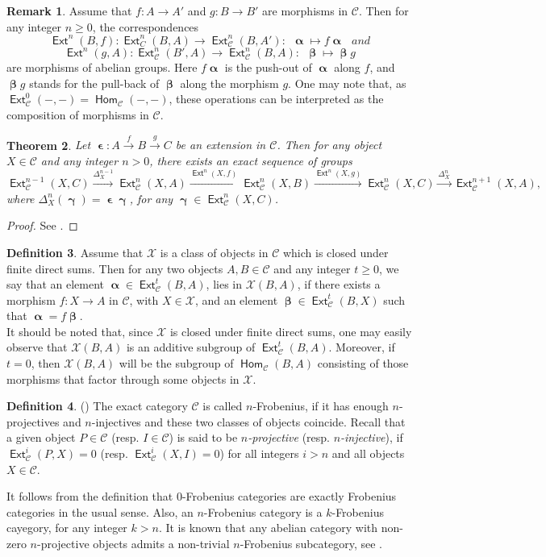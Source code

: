 \documentclass[11pt,a4paper]{amsart}
\newcommand{\rt}{\rightarrow}
\newcommand{\lrt}{\longrightarrow}
\newcommand{\st}{\stackrel}
\newcommand{\C}{\mathscr{C} }
\def\Ext{\operatorname{{\mathsf{Ext}}}}
\def\hom{\operatorname{{\mathsf{Hom}}}}
\def\hom{\operatorname{\mathsf{Hom}}}
\def\X{\mathcal{X}}
\def\al{\operatorname{\boldsymbol{\alpha}}}
\def\be{\operatorname{\boldsymbol{\beta}}}
\def\ga{\operatorname{\boldsymbol{\gamma}}}
\def\ep{\operatorname{\boldsymbol{\epsilon}}}
\newtheorem{theorem}{Theorem}[section]
\theoremstyle{definition}
\newtheorem{dfn}[theorem]{Definition}
\newtheorem{rem}[theorem]{Remark}
\theoremstyle{plain}
\theoremstyle{definition}
\numberwithin{equation}{section}
\begin{document}
\begin{rem}Assume that $f:A\rt A'$ and $g:B\rt B'$ are morphisms in $\C$. Then for any integer $n\geq 0$, the correspondences  $$\Ext^n(B, f):\Ext^n_C(B, A)\lrt\Ext^n_{\C}(B, A') :~~\al\mapsto f\al ~~~and$$
$$\Ext^n(g, A):\Ext^n_{\C}(B', A)\lrt\Ext^n_{\C}(B, A) :~~\be\mapsto \be g$$
are morphisms of abelian groups. Here $f\al$ is the push-out of $\al$ along $f$, and $\be g$ stands for the pull-back of $\be$ along the morphism $g$. One may note that, as $\Ext^0_{\C}(-, -)=\hom_{\C}(-, -)$, these operations can be interpreted as the composition of morphisms in $\C$.
\end{rem}

\begin{theorem}\label{long}Let $\ep: A\st{f}\rt B\st{g}\rt C$ be an extension in $\C$. Then for any object $X\in\C$ and any integer $n>0$, there exists an exact sequence of groups
$$\Ext^{n-1}_{\C}(X, C)\st{\Delta^{n-1}_X}\lrt\Ext^n_{\C}(X, A)\st{\Ext^n(X, f)}\lrt\Ext^n_{\C}(X, B)\st{\Ext^n(X, g)}\lrt\Ext^n_{\C}(X, C)\st{\Delta^n_X}\lrt\Ext^{n+1}_{\C}(X, A),$$where $\Delta^n_{X}(\ga)=\ep\ga$, for any $\ga\in\Ext^n_{\C}(X, C)$.
\end{theorem}
\begin{proof}See \cite[Chapter VII, Theorem 5.1]{mit}.
\end{proof}

\begin{dfn}\label{x}Assume that $\X$ is a class of objects in $\C$ which is closed under finite direct sums. Then for any two objects $A, B\in\C$ and any integer $t\geq 0$, we say that an element $\al\in\Ext^t_{\C}(B, A)$, lies in $\X(B, A)$, if there exists a morphism $f:X\rt A$ in $\C$, with $X\in\X$, and an element $\be\in\Ext^t_{\C}(B, X)$ such that $\al=f\be$. \\
It should be noted that, since $\X$ is closed under finite direct sums, one may easily observe that  $\X(B, A)$ is an additive subgroup of $\Ext^t_{\C}(B, A)$. Moreover, if $t=0$, then $\X(B, A)$ will be the subgroup of $\hom_{\C}(B, A)$ consisting of those morphisms that factor through some objects in $\X$.
\end{dfn}

\begin{dfn}(\cite[Definition 2.3]{bfss}) The exact category $\C$ is called $n$-Frobenius, if
it has enough $n$-projectives and $n$-injectives and these two classes of objects coincide. Recall that
a given object $P\in\C$ (resp. $I\in\C$) is said to be {\it $n$-projective} (resp. {\it $n$-injective}), if $\Ext^i_{\C}(P, X)=0$ (resp. $\Ext^i_{\C}(X, I)=0$) for all integers $i>n$ and all objects $X\in\C$.
\end{dfn}
It follows from the definition that 0-Frobenius categories are exactly Frobenius categories in the usual sense. Also, an $n$-Frobenius category is a $k$-Frobenius cayegory, for any integer $k>n$.  It is known that any abelian category with non-zero $n$-projective objects admits a non-trivial $n$-Frobenius subcategory, see \cite[Theorem 2.15]{bfss}.
\end{document}
